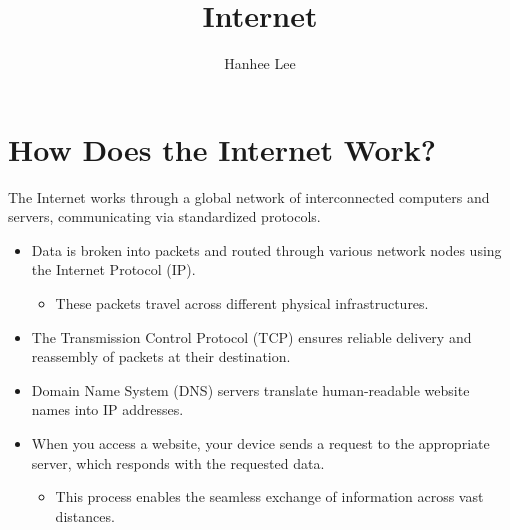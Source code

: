 \documentclass{article}
\title{Internet}
\author{Hanhee Lee}
\begin{document}
\maketitle

\tableofcontents

\section{How Does the Internet Work?}
\begin{definition}
    The Internet works through a global network of interconnected computers and servers, communicating via standardized protocols. 
    \begin{itemize}
        \item Data is broken into packets and routed through various network nodes using the Internet Protocol (IP). 
        \begin{itemize}
            \item These packets travel across different physical infrastructures.
        \end{itemize}
        \item The Transmission Control Protocol (TCP) ensures reliable delivery and reassembly of packets at their destination. 
        \item Domain Name System (DNS) servers translate human-readable website names into IP addresses. 
        \item When you access a website, your device sends a request to the appropriate server, which responds with the requested data. 
        \begin{itemize}
            \item This process enables the seamless exchange of information across vast distances.
        \end{itemize}
    \end{itemize}
\end{definition}
\end{document}
